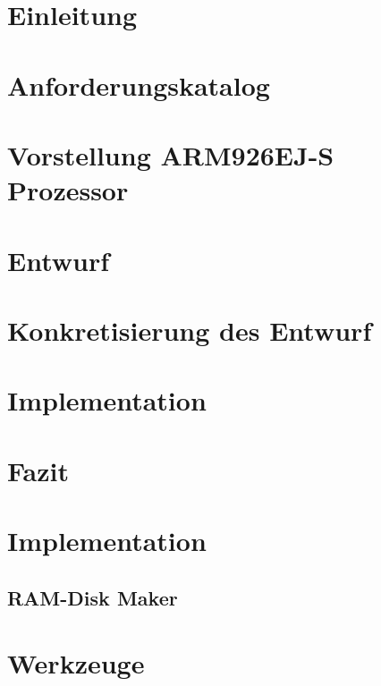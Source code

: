 \documentclass[fontsize=12pt,paper=A4,pagesize,DIV=calc,BCOR=1cm]{scrreprt}
\begin{document}
\onehalfspacing


\newpage
\thispagestyle{empty}
\mbox{}

\tableofcontents
{}
\listoftables
\listoffigures
\lstlistoflistings
{}
\chapter{Einleitung}

\chapter{Anforderungskatalog}

\chapter{Vorstellung ARM926EJ-S Prozessor}

\chapter{Entwurf}

\chapter{Konkretisierung des Entwurf}

\chapter{Implementation}

\chapter{Fazit}


\printbibliography[heading=bibintoc]

\appendix
{}
\chapter{Implementation}
\section{RAM-Disk Maker}

\chapter{Werkzeuge}

\end{document}
